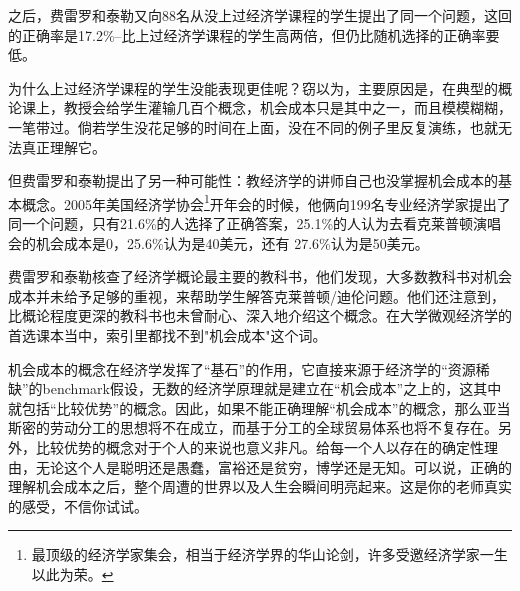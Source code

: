 \documentclass[10pt, a4paper]{ctexart} %
\begin{document}
之后，费雷罗和泰勒又向88名从没上过经济学课程的学生提出了同一个问题，这回的正确率是17.2\%--比上过经济学课程的学生高两倍，但仍比随机选择的正确率要低。 

为什么上过经济学课程的学生没能表现更佳呢？窃以为，主要原因是，在典型的概论课上，教授会给学生灌输几百个概念，机会成本只是其中之一，而且模模糊糊，一笔带过。倘若学生没花足够的时间在上面，没在不同的例子里反复演练，也就无法真正理解它。 

但费雷罗和泰勒提出了另一种可能性：教经济学的讲师自己也没掌握机会成本的基本概念。2005年美国经济学协会\footnote{最顶级的经济学家集会，相当于经济学界的华山论剑，许多受邀经济学家一生以此为荣。}开年会的时候，他俩向199名专业经济学家提出了同一个问题，只有21.6\%的人选择了正确答案，25.1\%的人认为去看克莱普顿演唱会的机会成本是0，25.6\%认为是40美元，还有 27.6\%认为是50美元。 

费雷罗和泰勒核查了经济学概论最主要的教科书，他们发现，大多数教科书对机会成本并未给予足够的重视，来帮助学生解答克莱普顿/迪伦问题。他们还注意到，比概论程度更深的教科书也未曾耐心、深入地介绍这个概念。在大学微观经济学的首选课本当中，索引里都找不到"机会成本"这个词。 

机会成本的概念在经济学发挥了“基石”的作用，它直接来源于经济学的“资源稀缺”的benchmark假设，无数的经济学原理就是建立在“机会成本”之上的，这其中就包括“比较优势”的概念。因此，如果不能正确理解“机会成本”的概念，那么亚当斯密的劳动分工的思想将不在成立，而基于分工的全球贸易体系也将不复存在。另外，比较优势的概念对于个人的来说也意义非凡。给每一个人以存在的确定性理由，无论这个人是聪明还是愚蠢，富裕还是贫穷，博学还是无知。可以说，正确的理解机会成本之后，整个周遭的世界以及人生会瞬间明亮起来。这是你的老师真实的感受，不信你试试。
\end{document}
